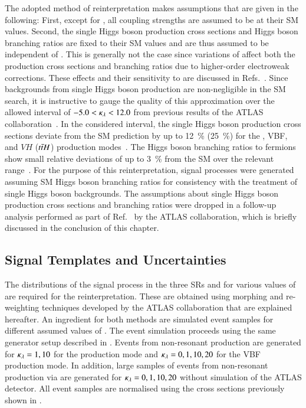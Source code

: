 The adopted method of reinterpretation makes assumptions that are given in the
following: First, except for \klambda, all coupling strengths are assumed to be
at their SM values. Second, the single Higgs boson production cross sections and
Higgs boson branching ratios are fixed to their SM values and are thus assumed
to be independent of \klambda. This is generally not the case since variations
of \klambda affect both the production cross sections and branching ratios due
to higher-order electroweak corrections. These effects and their sensitivity to
\klambda are discussed in
Refs.~\cite{ATL-PHYS-PUB-2019-009,Degrassi:2016wml,Maltoni:2017ims}.  Since
backgrounds from single Higgs boson production are non-negligible in the SM \HH
search, it is instructive to gauge the quality of this approximation over the
allowed interval of $-5.0 < \kappa_{\lambda} < 12.0$ from previous results of the ATLAS
collaboration~\cite{HDBS-2018-58}. In the considered \klambda interval, the
single Higgs boson production cross sections deviate from the SM prediction by
up to \SI{12}{\percent} (\SI{25}{\percent}) for the \ggF, VBF, and $VH$
($t\bar{t} H$) production modes~\cite{ATL-PHYS-PUB-2019-009}. The Higgs boson
branching ratios to fermions show small relative deviations of up to
\SI{3}{\percent} from the SM over the relevant \klambda
range~\cite{ATL-PHYS-PUB-2019-009}. For the purpose of this reinterpretation,
signal processes were generated assuming SM Higgs boson branching ratios for
consistency with the treatment of single Higgs boson backgrounds. The
assumptions about single Higgs boson production cross sections and branching
ratios were dropped in a follow-up analysis performed as part of
Ref.~\cite{HDBS-2022-03} by the ATLAS collaboration, which is briefly discussed
in the conclusion of this chapter.


\subsection{Signal Templates and Uncertainties}%
\label{sec:self_coupling_signals}

The distributions of the signal process in the three SRs
and for various values of \klambda are required for the
reinterpretation.
These are obtained using morphing and re-weighting techniques
developed by the ATLAS collaboration that are explained hereafter. An
ingredient for both methods are simulated event samples for different
assumed values of \klambda. The event simulation proceeds using the
same generator setup described in
. Events from non-resonant \HH
production are generated for $\kappa_{\lambda} = 1, 10$ for the \ggF
production mode and $\kappa_{\lambda} = 0, 1, 10, 20$ for the VBF production
mode. In addition, large samples of events from non-resonant \HH
production via \ggF are generated for $\kappa_{\lambda} = 0, 1, 10, 20$
without simulation of the ATLAS detector. All event samples are
normalised using the cross sections previously shown in
.

